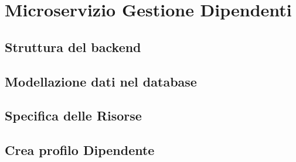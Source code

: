 \documentclass{report}
\begin{document}
\section{Microservizio Gestione Dipendenti}
	\subsection*{Struttura del backend}
	\subsection*{Modellazione dati nel database}
	\subsection*{Specifica delle Risorse}

	\subsection*{Crea profilo Dipendente}
\end{document}
